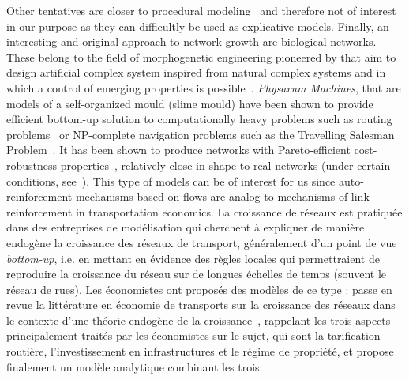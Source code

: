 {Other tentatives \cite{de2007netlogo,yamins2003growing} are closer to procedural modeling~\cite{lechner2004procedural,watson2008procedural} and therefore not of interest in our purpose as they can difficultly be used as explicative models. Finally, an interesting and original approach to network growth are biological networks. These belong to the field of morphogenetic engineering pioneered by  that aim to design artificial complex system inspired from natural complex systems and in which a control of emerging properties is possible~\cite{doursat2012morphogenetic}. \emph{Physarum Machines}, that are models of a self-organized mould (slime mould) have been shown to provide efficient bottom-up solution to computationally heavy problems such as routing problems~\cite{tero2006physarum} or NP-complete navigation problems such as the Travelling Salesman Problem~\cite{zhu2013amoeba}. It has been shown to produce networks with Pareto-efficient cost-robustness properties~\cite{tero2010rules}, relatively close in shape to real networks (under certain conditions, see~\cite{adamatzky2010road}). This type of models can be of interest for us since auto-reinforcement mechanisms based on flows are analog to mechanisms of link reinforcement in transportation economics.
}{
La croissance de réseaux est pratiquée dans des entreprises de modélisation qui cherchent à expliquer de manière endogène la croissance des réseaux de transport, généralement d'un point de vue \emph{bottom-up}, i.e. en mettant en évidence des règles locales qui permettraient de reproduire la croissance du réseau sur de longues échelles de temps (souvent le réseau de rues). Les économistes ont proposés des modèles de ce type : \cite{zhang2007economics} passe en revue la littérature en économie de transports sur la croissance des réseaux dans le contexte d'une théorie endogène de la croissance~\cite{aghion1998endogenous}, rappelant les trois aspects principalement traités par les économistes sur le sujet, qui sont la tarification routière, l'investissement en infrastructures et le régime de propriété, et propose finalement un modèle analytique combinant les trois.
}
